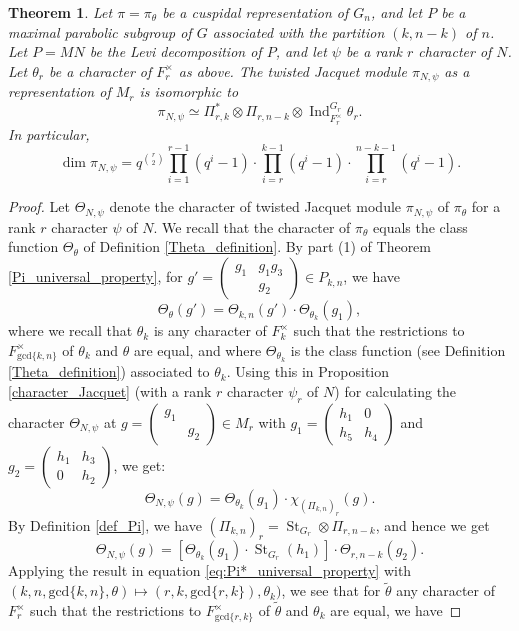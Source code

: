 \documentclass[reqno]{amsart}
\newtheorem{theorem}{Theorem}[section]
\theoremstyle{definition}
\theoremstyle{remark}
\numberwithin{equation}{section}
\DeclareMathOperator{\Ind}{Ind}
\DeclareMathOperator{\St}{St}
\newcommand{\bbsm}{\left (\begin{smallmatrix}}      \newcommand{\besm}{\end{smallmatrix}\right )}
\begin{document}
{{\begin{theorem} \label{main_theorem}
Let $\pi=\pi_\theta$ be a cuspidal representation of $G_n$, and let $P$ be a maximal parabolic subgroup of $G$ associated with the partition $(k,n-k)$ of $n$. Let $P=MN$ be the Levi decomposition of $P$, and let $\psi$ be a rank $r$ character of $N$. Let $\theta_r$ be a character of $F_r^\times$ as above. The  twisted Jacquet module $\pi_{N, \psi}$ as a representation of $M_r$ is isomorphic to 
\[ \pi_{N, \psi} \simeq \Pi^*_{r,k} \otimes \Pi_{r,n-k} \otimes \Ind_{F_r^\times}^{G_r} \theta_r. \] 
In particular,
\[ \dim  \pi_{N,\psi} =
q^{\binom{r}{2}} \prod_{i=1}^{r-1}(q^i-1) \cdot \prod_{i=r}^{k-1}(q^i-1) \cdot \prod_{i=r}^{n-k-1}(q^i-1).\]
\end{theorem}
\begin{proof}
Let $\Theta_{N, \psi}$ denote the character of  twisted Jacquet module $\pi_{N, \psi}$ of $\pi_\theta$ for a rank $r$ character $\psi$ of $N$.
We recall that the character of $\pi_\theta$ equals the class function $\Theta_\theta$ of Definition \ref{Theta_definition}.
By part (1) of Theorem \ref{Pi_universal_property}, for $g' = \bbsm g_1 & g_1g_3 \\& g_2 \besm \in P_{k,n}$, we have \[ \Theta_{\theta}(g')=\Theta_{k,n}(g') \cdot \Theta_{\theta_k}(g_1), \]
where we recall that $\theta_k$ is any character of $F_k^\times$ such that the restrictions to $F_{\text{gcd}\{k,n\}}^\times$ of $\theta_k$ and $\theta$ are equal, and where $\Theta_{\theta_k}$ is the  class function (see Definition \ref{Theta_definition}) associated to $\theta_k$.  Using this in Proposition \ref{character_Jacquet} (with a rank $r$ character $\psi_r$ of $N$) for calculating  the character $\Theta_{N, \psi}$
at $g=\bbsm g_1 & \\ & g_2 \besm \in M_r$ with $g_1=\bbsm h_1 &  0\\
    h_5 & h_4\besm$ and $g_2=\bbsm
    h_1& h_3\\0&h_2 \besm$, we get:
\[ \Theta_{N, \psi}(g) = \Theta_{\theta_k}(g_1) \cdot \chi_{ (\Pi_{k,n})_r}(g). \]
 By Definition \ref{def_Pi}, we have $ (\Pi_{k,n})_r= \St_{G_r} \otimes \Pi_{r,n-k}$, and hence we get
\[ \Theta_{N, \psi}(g) = \left[ \Theta_{\theta_k}(g_1) \cdot \St_{G_r}(h_1) \right] \cdot \Theta_{r,n-k}(g_2). \]
Applying the result in equation \eqref{eq:Pi*_universal_property} with $(k,n, \text{gcd}\{k,n\},\theta) \mapsto (r,k,\text{gcd}\{r,k\}),\theta_k)$, we see that for $\tilde\theta$ any  character  of $F_r^\times$ such that the restrictions to $F_{\text{gcd}\{r,k\}}^\times$ of $\tilde\theta$ and $\theta_k$ are equal, we have

\end{proof}}}
\end{document}

